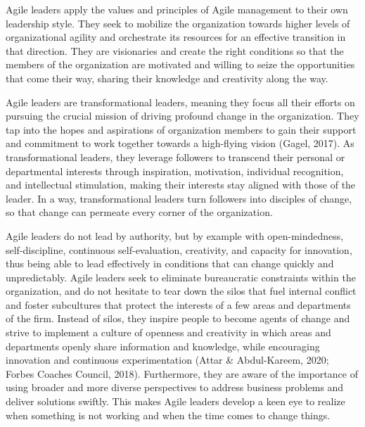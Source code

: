 \documentclass[
  letterpaper,
  DIV=11,
  numbers=noendperiod]{scrreprt}
\begin{document}
Agile leaders apply the values and principles of Agile management to
their own leadership style. They seek to mobilize the organization
towards higher levels of organizational agility and orchestrate its
resources for an effective transition in that direction. They are
visionaries and create the right conditions so that the members of the
organization are motivated and willing to seize the opportunities that
come their way, sharing their knowledge and creativity along the way.

Agile leaders are transformational leaders, meaning they focus all their
efforts on pursuing the crucial mission of driving profound change in
the organization. They tap into the hopes and aspirations of
organization members to gain their support and commitment to work
together towards a high-flying vision (Gagel, 2017). As transformational
leaders, they leverage followers to transcend their personal or
departmental interests through inspiration, motivation, individual
recognition, and intellectual stimulation, making their interests stay
aligned with those of the leader. In a way, transformational leaders
turn followers into disciples of change, so that change can permeate
every corner of the organization.

Agile leaders do not lead by authority, but by example with
open-mindedness, self-discipline, continuous self-evaluation,
creativity, and capacity for innovation, thus being able to lead
effectively in conditions that can change quickly and unpredictably.
Agile leaders seek to eliminate bureaucratic constraints within the
organization, and do not hesitate to tear down the silos that fuel
internal conflict and foster subcultures that protect the interests of a
few areas and departments of the firm. Instead of silos, they inspire
people to become agents of change and strive to implement a culture of
openness and creativity in which areas and departments openly share
information and knowledge, while encouraging innovation and continuous
experimentation (Attar \& Abdul-Kareem, 2020; Forbes Coaches Council,
2018). Furthermore, they are aware of the importance of using broader
and more diverse perspectives to address business problems and deliver
solutions swiftly. This makes Agile leaders develop a keen eye to
realize when something is not working and when the time comes to change
things.
\end{document}
